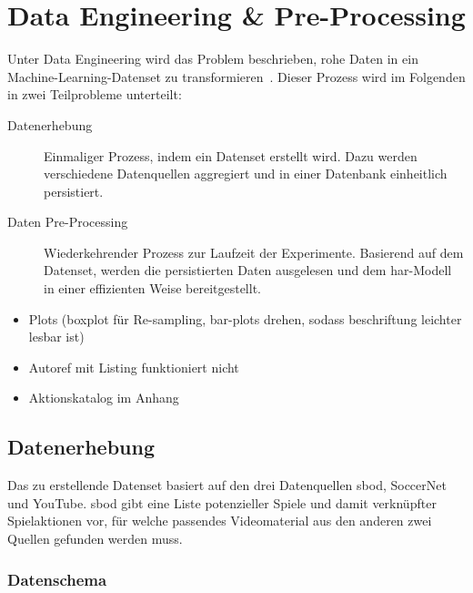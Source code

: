 \chapter{Data Engineering \& Pre-Processing}
\label{ch:data}

\newcommand{\noaction}{37521\ }
\newcommand{\novideos}{194\ }
\newcommand{\nomatches}{152\ }

Unter Data Engineering wird das Problem beschrieben, rohe Daten in ein Machine-Learning-Datenset zu transformieren~\cite{Burkov19}.
Dieser Prozess wird im Folgenden in zwei Teilprobleme unterteilt:
\begin{description}
    \item[Datenerhebung] Einmaliger Prozess, indem ein Datenset erstellt wird.
        Dazu werden verschiedene Datenquellen aggregiert und in einer Datenbank einheitlich persistiert.
    \item[Daten Pre-Processing] Wiederkehrender Prozess zur Laufzeit der Experimente.
        Basierend auf dem Datenset, werden die persistierten Daten ausgelesen und dem \gls{har}-Modell in einer effizienten Weise bereitgestellt.
\end{description}

\begin{tcolorbox}[title=WIP]
    \begin{itemize}
        \item Plots (boxplot für Re-sampling, bar-plots drehen, sodass beschriftung leichter lesbar ist)
        \item Autoref mit Listing funktioniert nicht
        \item Aktionskatalog im Anhang
    \end{itemize}
\end{tcolorbox}


\section{Datenerhebung}
\label{sec:datenerhebung}

Das zu erstellende Datenset basiert auf den drei Datenquellen \gls{sbod}, SoccerNet und YouTube.
\gls{sbod} gibt eine Liste potenzieller Spiele und damit verknüpfter Spielaktionen vor, für welche passendes Videomaterial aus den anderen zwei Quellen gefunden werden muss.

\subsection{Datenschema}
\label{subsec:schema}

